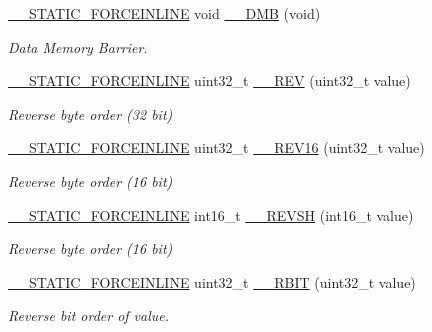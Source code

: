 \begin{DoxyCompactItemize}
\mbox{\hyperlink{cmsis__iccarm_8h_ab904513442afdf77d4f8c74f23cbb040}{\+\_\+\+\_\+\+S\+T\+A\+T\+I\+C\+\_\+\+F\+O\+R\+C\+E\+I\+N\+L\+I\+NE}} void \mbox{\hyperlink{group___c_m_s_i_s___core___instruction_interface_gab1ea24daaaaee9c828f90cbca330cb5e}{\+\_\+\+\_\+\+D\+MB}} (void)
\begin{DoxyCompactList}\small\item\em Data Memory Barrier. \end{DoxyCompactList}\item 
\mbox{\hyperlink{cmsis__iccarm_8h_ab904513442afdf77d4f8c74f23cbb040}{\+\_\+\+\_\+\+S\+T\+A\+T\+I\+C\+\_\+\+F\+O\+R\+C\+E\+I\+N\+L\+I\+NE}} uint32\+\_\+t \mbox{\hyperlink{group___c_m_s_i_s___core___instruction_interface_gadb92679719950635fba8b1b954072695}{\+\_\+\+\_\+\+R\+EV}} (uint32\+\_\+t value)
\begin{DoxyCompactList}\small\item\em Reverse byte order (32 bit) \end{DoxyCompactList}\item 
\mbox{\hyperlink{cmsis__iccarm_8h_ab904513442afdf77d4f8c74f23cbb040}{\+\_\+\+\_\+\+S\+T\+A\+T\+I\+C\+\_\+\+F\+O\+R\+C\+E\+I\+N\+L\+I\+NE}} uint32\+\_\+t \mbox{\hyperlink{group___c_m_s_i_s___core___instruction_interface_gaa12aedd096506c9639c1581acd5c6a78}{\+\_\+\+\_\+\+R\+E\+V16}} (uint32\+\_\+t value)
\begin{DoxyCompactList}\small\item\em Reverse byte order (16 bit) \end{DoxyCompactList}\item 
\mbox{\hyperlink{cmsis__iccarm_8h_ab904513442afdf77d4f8c74f23cbb040}{\+\_\+\+\_\+\+S\+T\+A\+T\+I\+C\+\_\+\+F\+O\+R\+C\+E\+I\+N\+L\+I\+NE}} int16\+\_\+t \mbox{\hyperlink{group___c_m_s_i_s___core___instruction_interface_gacb695341318226a5f69ed508166622ac}{\+\_\+\+\_\+\+R\+E\+V\+SH}} (int16\+\_\+t value)
\begin{DoxyCompactList}\small\item\em Reverse byte order (16 bit) \end{DoxyCompactList}\item 
\mbox{\hyperlink{cmsis__iccarm_8h_ab904513442afdf77d4f8c74f23cbb040}{\+\_\+\+\_\+\+S\+T\+A\+T\+I\+C\+\_\+\+F\+O\+R\+C\+E\+I\+N\+L\+I\+NE}} uint32\+\_\+t \mbox{\hyperlink{group___c_m_s_i_s___core___instruction_interface_gaf944a7b7d8fd70164cca27669316bcf7}{\+\_\+\+\_\+\+R\+B\+IT}} (uint32\+\_\+t value)
\begin{DoxyCompactList}\small\item\em Reverse bit order of value. \end{DoxyCompactList}\end{DoxyCompactItemize}
